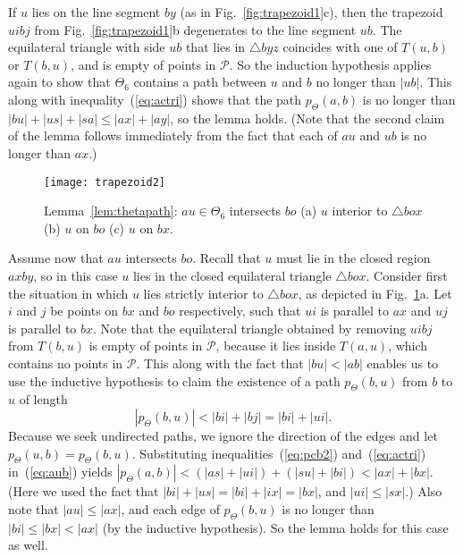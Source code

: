 \documentclass[11pt]{article}
\newcommand\Pt{\mathcal P}
\begin{document}
If $u$ lies on the line segment $by$ (as in Fig.~\ref{fig:trapezoid1}c), then the trapezoid $uibj$ from Fig.~\ref{fig:trapezoid1}b degenerates to the line segment $ub$. The equilateral triangle with side $ub$ that lies in $\triangle byz$ coincides with one of $T(u, b)$ or $T(b, u)$, and is empty of points in $\Pt$. So the induction hypothesis applies again to show that $\Theta_6$ contains a path between $u$ and $b$ no longer than $|ub|$. This along with inequality~(\ref{eq:actri}) shows that the path $p_\Theta(a, b)$ is no longer than $|bu| + |us| + |sa| \le |ax| + |ay|$, so the lemma holds. (Note that the second claim of the lemma follows immediately from the fact that each of $au$ and $ub$ is no longer than $ax$.)

\begin{figure}[htpb]
\centering
\texttt{[image: trapezoid2]}
\caption{Lemma~\ref{lem:thetapath}: $au \in \Theta_6$ intersects $bo$ (a) $u$ interior to $\triangle box$ (b) $u$ on $bo$ (c) $u$ on $bx$.}
\label{fig:trapezoid2}
\end{figure}


Assume now that $au$ intersects $bo$. Recall that $u$ must lie in the closed region $axby$, so in this case $u$ lies in the closed equilateral triangle $\triangle box$.
Consider first the situation in which $u$ lies strictly interior to $\triangle box$, as depicted in  Fig.~\ref{fig:trapezoid2}a. Let $i$ and $j$ be points on $bx$ and $bo$ respectively, such that $ui$ is parallel to $ax$ and $uj$ is parallel to $bx$. Note that the equilateral triangle obtained by removing $uibj$ from $T(b, u)$ is empty of points in $\Pt$, because it lies inside $T(a, u)$, which contains no points in $\Pt$.
This along with the fact that $|bu| < |ab|$ enables us to use the inductive hypothesis to claim the existence of a path $p_\Theta(b, u)$ from $b$ to $u$ of length
\begin{equation}
|p_\Theta(b, u)| < |bi| +|bj| = |bi| + |ui|.
\label{eq:pcb2}
\end{equation}
Because we seek undirected paths, we ignore the direction of the edges and let $p_\Theta(u, b) = p_\Theta(b, u)$. Substituting inequalities~(\ref{eq:pcb2}) and~(\ref{eq:actri}) in~(\ref{eq:aub}) yields
$|p_\Theta(a, b)| < (|as| +|ui|) + (|su| + |bi|) < |ax| + |bx|$. (Here we used the fact that $|bi| + |us| = |bi| + |ix| = |bx|$, and $|ui| \le |sx|$.) Also note that $|au| \le |ax|$, and each edge of $p_\Theta(b, u)$ is no longer than $|bi| \le |bx| < |ax|$ (by the inductive hypothesis). So the lemma holds for this case as well.
\end{document}
